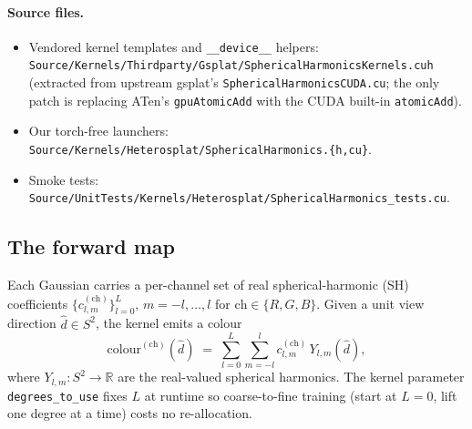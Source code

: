 \documentclass[11pt]{article}
\newcommand{\R}{\mathbb{R}}
\begin{document}
\paragraph{Source files.}
\begin{itemize}
  \item Vendored kernel templates and \texttt{\_\_device\_\_} helpers:\\
  \texttt{Source/Kernels/Thirdparty/Gsplat/SphericalHarmonicsKernels.cuh}
  (extracted from upstream gsplat's \texttt{SphericalHarmonicsCUDA.cu};
  the only patch is replacing ATen's \texttt{gpuAtomicAdd} with the
  CUDA built-in \texttt{atomicAdd}).
  \item Our torch-free launchers:
  \texttt{Source/Kernels/Heterosplat/SphericalHarmonics.\{h,cu\}}.
  \item Smoke tests:
  \texttt{Source/UnitTests/Kernels/Heterosplat/SphericalHarmonics\_tests.cu}.
\end{itemize}

\subsection{The forward map}

Each Gaussian carries a per-channel set of real spherical-harmonic
(SH) coefficients
$\{c_{l,m}^{(\text{ch})}\}_{l = 0}^{L},\, m = -l, \dots, l$ for
$\text{ch} \in \{R, G, B\}$. Given a unit view direction
$\hat d \in S^2$, the kernel emits a colour
\begin{equation}
  \text{colour}^{(\text{ch})}(\hat d)
  \;=\;
  \sum_{l=0}^{L} \sum_{m=-l}^{l}
    c_{l,m}^{(\text{ch})}\, Y_{l,m}(\hat d),
\end{equation}
where $Y_{l,m} : S^2 \to \R$ are the real-valued spherical harmonics.
The kernel parameter \texttt{degrees\_to\_use} fixes $L$ at runtime so
coarse-to-fine training (start at $L = 0$, lift one degree at a time)
costs no re-allocation.
\end{document}
